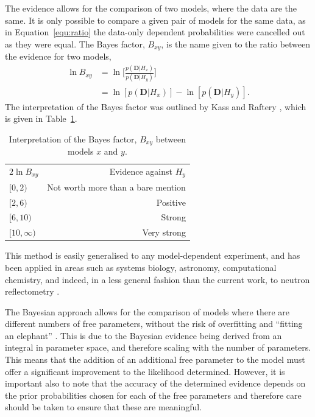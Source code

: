 \documentclass[
 reprint,
 superscriptaddress,
 amsmath,amssymb,
 aps,
]{revtex4-1}
\begin{document}
The evidence allows for the comparison of two models, where the data are the same.
It is only possible to compare a given pair of models for the same data, as in Equation~\ref{equ:ratio} the data-only dependent probabilities were cancelled out as they were equal. 
The Bayes factor, $B_{xy}$, is the name given to the ratio between the evidence for two models, 
%
\begin{equation}
    \begin{aligned}
        \ln{B_{xy}} & = \ln{\Bigg[\frac{p(\bm{D}|H_x)}{p(\bm{D}|H_y)}\Bigg]} \\
        & = \ln[p(\bm{D}|H_x)] - \ln[p(\bm{D}|H_y)]. 
    \end{aligned}
\end{equation}
The interpretation of the Bayes factor was outlined by Kass and Raftery \cite{kass_bayes_1995}, which is given in Table~\ref{tab:kass}.
%
\begin{table}
\caption{\label{tab:kass} Interpretation of the Bayes factor, $B_{xy}$ between models $x$ and $y$.}
\begin{ruledtabular}
\begin{tabular}{lr}
\textrm{$2\ln{B_{xy}}$} & Evidence against $H_y$\\
\colrule
$[0, 2)$ & Not worth more than a bare mention \\
$[2, 6)$ & Positive \\
$[6, 10)$ & Strong \\
$[10, \infty)$ & Very strong \\
\end{tabular}
\end{ruledtabular}
\end{table}
%
This method is easily generalised to any model-dependent experiment, and has been applied in areas such as systems biology, astronomy, computational chemistry, and indeed, in a less general fashion than the current work, to neutron reflectometry \cite{pullen_bayesian_2014,cornish_tests_2007,ensign_bayesian_2010,sivia_bayesian_1998}. 

The Bayesian approach allows for the comparison of models where there are different numbers of free parameters, without the risk of overfitting and ``fitting an elephant'' \cite{mayer_drawing_2010}.
This is due to the Bayesian evidence being derived from an integral in parameter space, and therefore scaling with the number of parameters. 
This means that the addition of an additional free parameter to the model must offer a significant improvement to the likelihood determined.
However, it is important also to note that the accuracy of the determined evidence depends on the prior probabilities chosen for each of the free parameters and therefore care should be taken to ensure that these are meaningful. 
\end{document}
